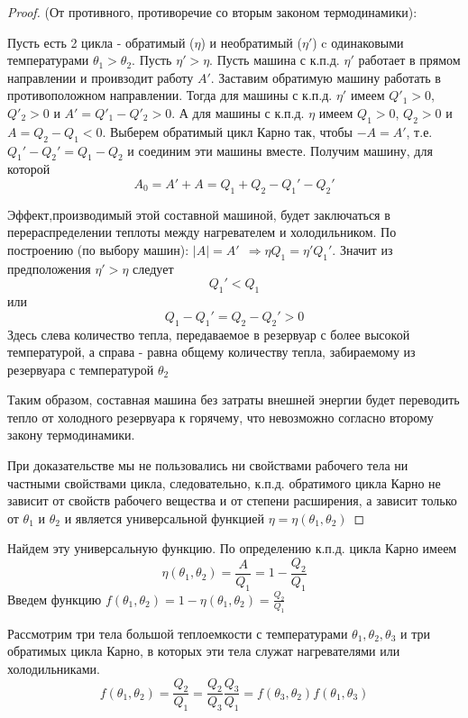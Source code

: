 \begin{proof}
(От противного, противоречие со вторым законом термодинамики):

Пусть есть 2 цикла - обратимый ($\eta$) и необратимый ($\eta'$) c одинаковыми температурами $\theta_1 > \theta_2$. Пусть $\eta' > \eta$. Пусть машина с к.п.д. $\eta'$ работает в прямом направлении и проивзодит работу $A'$. Заставим обратимую машину работать в противоположном направлении.  Тогда для машины с к.п.д. $\eta'$ имеем $Q'_1 > 0$, $Q'_2 > 0$ и $A' = Q'_1 - Q'_2 > 0$.  А для машины с к.п.д. $\eta$ имеем $Q_1 > 0$, $Q_2 > 0$ и $A = Q_2 - Q_1 < 0$. Выберем обратимый цикл Карно так, чтобы $-A = A'$, т.е. $Q_1' - Q_2' = Q_1 - Q_2$ и соединим эти машины вместе. Получим машину, для которой $$ A_0 = A' + A = Q_1 + Q_2 - Q_1' - Q_2' $$

Эффект,производимый этой составной машиной, будет заключаться в перераспределении теплоты между нагревателем и холодильником. По построению (по выбору машин): $|A| = A' \ \ \Rightarrow \eta Q_1 = \eta'Q_1' $. Значит из предположения $\eta' > \eta$ следует $$ Q_1' < Q_1 $$
или $$ Q_1 - Q_1' = Q_2 - Q_2' > 0 $$
Здесь слева количество тепла,  передаваемое в резервуар с более высокой температурой, а справа - равна общему количеству тепла, забираемому из резервуара с температурой $\theta_2$

Таким образом, составная машина без затраты внешней энергии будет переводить тепло от холодного резервуара к горячему, что невозможно согласно второму закону термодинамики.

При доказательстве мы не пользовались ни свойствами рабочего тела ни частными свойствами цикла, следовательно, к.п.д.  обратимого цикла Карно не зависит от свойств рабочего вещества и от степени расширения,  а зависит только от $\theta_1$ и $\theta_2$ и является универсальной функцией $\eta = \eta(\theta_1, \theta_2)$

\end{proof} 

Найдем эту универсальную функцию.  По определению к.п.д. цикла Карно имеем
$$ \eta(\theta_1, \theta_2) = \frac{A}{Q_1} = 1 - \frac{Q_2}{Q_1} $$
Введем функцию $f(\theta_1, \theta_2) = 1 - \eta(\theta_1, \theta_2) = \frac{Q_2}{Q_1}$

Рассмотрим три тела большой теплоемкости с температурами $\theta_1, \theta_2, \theta_3$ и три обратимых цикла Карно, в которых эти тела служат нагревателями или холодильниками.
$$ f(\theta_1, \theta_2) = \frac{Q_2}{Q_1} = \frac{Q_2}{Q_3}\frac{Q_3}{Q_1} = f(\theta_3, \theta_2)f(\theta_1, \theta_3) $$

